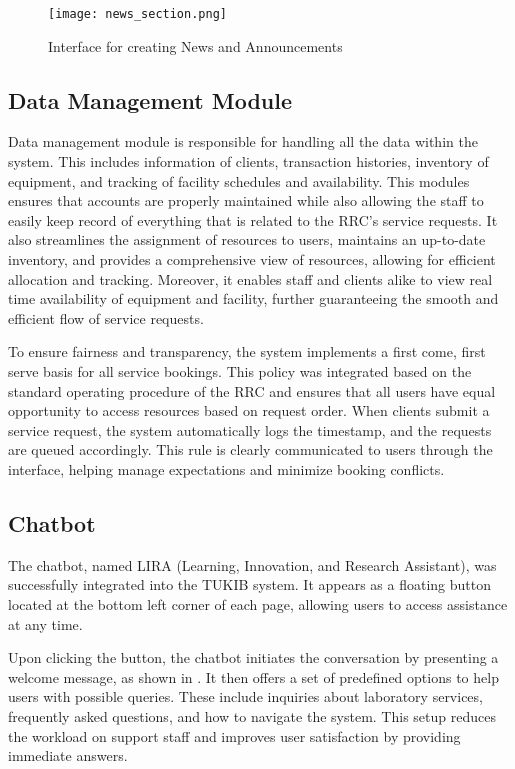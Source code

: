 \begin{figure}[h]
    \centering
    \texttt{[image: news\_section.png]}
    \caption{Interface for creating News and Announcements}
    \label{fig:announcements}
\end{figure}

\newpage

\subsection{Data Management Module}

Data management module is responsible for handling all the data within the system. This includes information of clients, transaction histories, inventory of equipment, and tracking of facility schedules and availability. This modules ensures that accounts are properly maintained while also allowing the staff to easily keep record of everything that is related to the RRC's service requests. It also streamlines the assignment of resources to users, maintains an up-to-date inventory, and provides a comprehensive view of resources, allowing for efficient allocation and tracking. Moreover, it enables staff and clients alike to view real time availability of equipment and facility, further guaranteeing the smooth and efficient flow of  service requests. 

To ensure fairness and transparency, the system implements a first come, first serve basis for all service bookings. This policy was integrated based on the standard operating procedure of the RRC and ensures that all users have equal opportunity to access resources based on request order. When clients submit a service request, the system automatically logs the timestamp, and the requests are queued accordingly. This rule is clearly communicated to users through the interface, helping manage expectations and minimize booking conflicts.

\subsection{Chatbot}

The chatbot, named LIRA (Learning, Innovation, and Research Assistant), was successfully integrated into the TUKIB system. It appears as a floating button located at the bottom left corner of each page, allowing users to access assistance at any time.

Upon clicking the button, the chatbot initiates the conversation by presenting a welcome message, as shown in . It then offers a set of predefined options to help users with possible queries. These include inquiries about laboratory services, frequently asked questions, and how to navigate the system. This setup reduces the workload on support staff and improves user satisfaction by providing immediate answers.\newline

